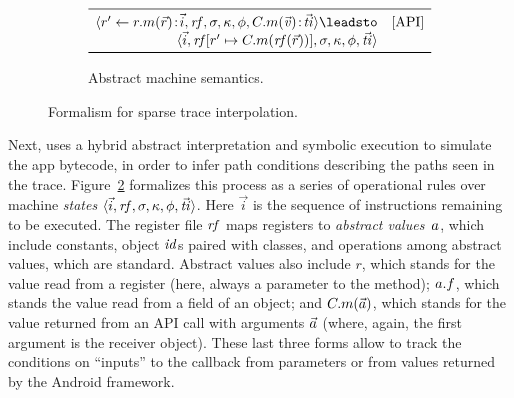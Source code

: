 \begin{figure}[t]
\begin{subfigure}{\columnwidth}
\begin{displaymath}
\begin{array}{lr}
      \\ \midrule

      \langle r' \leftarrow r.m(\vec{r})\cpair\vec{i}, \var{rf}, \sigma, \kappa, \phi, C.m(\vec{\var{v}})\cpair\vec{\var{ti}} \rangle
      \leadsto
      & \text{[API]} \\
      \multicolumn{1}{r}{
      \langle \vec{i}, \var{rf}[r' \mapsto C.m(\var{rf}(\vec{r}))], \sigma, \kappa, \phi, \vec{\var{ti}} \rangle
      } \\ \bottomrule
    \end{array}
  \end{displaymath}
  \caption{Abstract machine semantics.}
  \label{fig:rules}
\end{subfigure}

\caption{Formalism for sparse trace interpolation.}
\label{fig:symbolic-exec}
\end{figure}

Next, \hogarth{} uses a hybrid abstract interpretation and symbolic execution
to simulate the app bytecode, in order to infer path conditions describing the paths seen
in the trace.  Figure~\ref{fig:symbolic-exec} formalizes this process as a
series of operational rules over machine \emph{states}
$\langle \vec{i}, \mathit{rf}, \sigma, \kappa, \phi, \vec{\mathit{ti}}
\rangle$.
Here $\vec{i}$ is the sequence of instructions remaining to
be executed. The register file $\mathit{rf}$ maps registers to
\emph{abstract values}~$a$, which include constants, object
$\mathit{id}$s paired with classes, and operations among abstract values,
which are standard. Abstract values also include
$r$, which stands for the value read from a register (here, always a
parameter to the method); 
$a.f$, which stands the value read from a field of an object; and
$C.m(\vec{a})$, which stands for the value returned from an
API call with arguments $\vec{a}$ (where, again, the first
argument is the receiver object). These last three forms allow
\hogarth{} to track the conditions on ``inputs'' to the callback from
parameters or from values returned by the Android framework.


